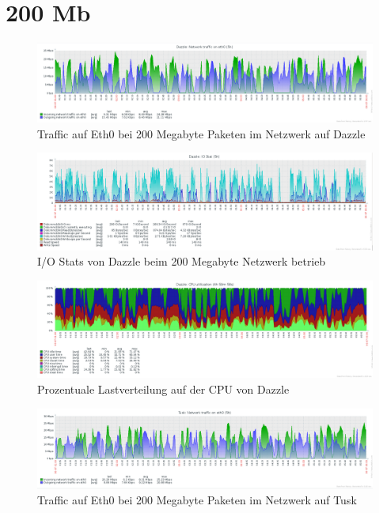 \section{200 Mb}
\begin{figure}[htbp]
\centering
\includegraphics*[width=0.9\linewidth, angle=90]{Abb/ZabbixDazzle/Standard/Standard200}

\caption{Traffic auf Eth0 bei 200 Megabyte Paketen im Netzwerk auf Dazzle}
\label{fig:Eth0Dazzle200}
\end{figure}


\begin{figure}[htbp]
\centering
\includegraphics*[width=0.9\linewidth, angle=90]{Abb/ZabbixDazzle/Standard/IoStatStandard200}

\caption{I/O Stats von Dazzle beim 200 Megabyte Netzwerk betrieb}
\label{fig:IoStatDazzle200}
\end{figure} %

\begin{figure}[htbp]
\centering
\includegraphics*[width=0.9\linewidth, angle=90]{Abb/ZabbixDazzle/Standard/CPUStandard200}

\caption{Prozentuale Lastverteilung auf der CPU von Dazzle}
\label{fig:CPUDazzle200}
\end{figure}

\begin{figure}[htbp]
\centering
\includegraphics*[width=0.9\linewidth, angle=90]{Abb/ZabbixTusk/Standard/Standard200}

\caption{Traffic auf Eth0 bei 200 Megabyte Paketen im Netzwerk auf Tusk}
\label{fig:Eth0Tusk200}
\end{figure}


